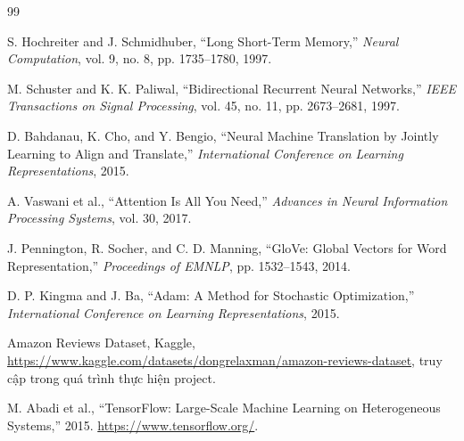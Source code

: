 \documentclass[12pt]{report}
\begin{document}
\begin{thebibliography}{99}

S. Hochreiter and J. Schmidhuber,
``Long Short-Term Memory,''
\textit{Neural Computation}, vol. 9, no. 8, pp. 1735--1780, 1997.

M. Schuster and K. K. Paliwal,
``Bidirectional Recurrent Neural Networks,''
\textit{IEEE Transactions on Signal Processing}, vol. 45, no. 11,
pp. 2673--2681, 1997.

D. Bahdanau, K. Cho, and Y. Bengio,
``Neural Machine Translation by Jointly Learning to Align and Translate,''
\textit{International Conference on Learning Representations}, 2015.

A. Vaswani et al.,
``Attention Is All You Need,''
\textit{Advances in Neural Information Processing Systems}, vol. 30, 2017.

J. Pennington, R. Socher, and C. D. Manning,
``GloVe: Global Vectors for Word Representation,''
\textit{Proceedings of EMNLP}, pp. 1532--1543, 2014.

D. P. Kingma and J. Ba,
``Adam: A Method for Stochastic Optimization,''
\textit{International Conference on Learning Representations}, 2015.

Amazon Reviews Dataset, Kaggle,
\url{https://www.kaggle.com/datasets/dongrelaxman/amazon-reviews-dataset},
truy cập trong quá trình thực hiện project.

M. Abadi et al.,
``TensorFlow: Large-Scale Machine Learning on Heterogeneous Systems,''
2015. \url{https://www.tensorflow.org/}.

\end{thebibliography}

\newpage
\end{document}
